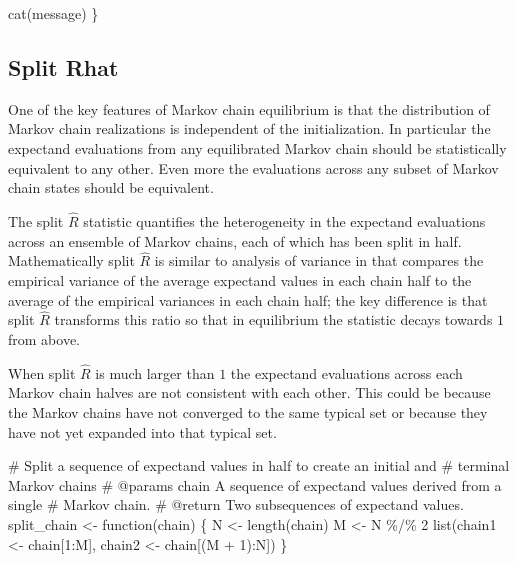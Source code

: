 \documentclass[
  letterpaper,
  DIV=11,
  numbers=noendperiod]{scrartcl}
\newenvironment{Shaded}{\begin{snugshade}}{\end{snugshade}}
\newcommand{\BuiltInTok}[1]{\textcolor[rgb]{0.00,0.23,0.31}{#1}}
\newcommand{\CommentTok}[1]{\textcolor[rgb]{0.37,0.37,0.37}{#1}}
\newcommand{\DecValTok}[1]{\textcolor[rgb]{0.68,0.00,0.00}{#1}}
\newcommand{\NormalTok}[1]{\textcolor[rgb]{0.00,0.23,0.31}{#1}}
\newcommand{\OperatorTok}[1]{\textcolor[rgb]{0.37,0.37,0.37}{#1}}
\begin{document}
\begin{Shaded}
\begin{Highlighting}[]
\NormalTok{  cat(message)}
\NormalTok{\}}
\end{Highlighting}
\end{Shaded}

\subsection{Split Rhat}\label{split-rhat}

One of the key features of Markov chain equilibrium is that the
distribution of Markov chain realizations is independent of the
initialization. In particular the expectand evaluations from any
equilibrated Markov chain should be statistically equivalent to any
other. Even more the evaluations across any subset of Markov chain
states should be equivalent.

The split \(\hat{R}\) statistic quantifies the heterogeneity in the
expectand evaluations across an ensemble of Markov chains, each of which
has been split in half. Mathematically split \(\hat{R}\) is similar to
analysis of variance in that compares the empirical variance of the
average expectand values in each chain half to the average of the
empirical variances in each chain half; the key difference is that split
\(\hat{R}\) transforms this ratio so that in equilibrium the statistic
decays towards \(1\) from above.

When split \(\hat{R}\) is much larger than \(1\) the expectand
evaluations across each Markov chain halves are not consistent with each
other. This could be because the Markov chains have not converged to the
same typical set or because they have not yet expanded into that typical
set.

\begin{Shaded}
\begin{Highlighting}[]
\CommentTok{\# Split a sequence of expectand values in half to create an initial and }
\CommentTok{\# terminal Markov chains}
\CommentTok{\# @params chain A sequence of expectand values derived from a single }
\CommentTok{\#               Markov chain.}
\CommentTok{\# @return Two subsequences of expectand values.}
\NormalTok{split\_chain }\OperatorTok{\textless{}{-}}\NormalTok{ function(chain) \{}
\NormalTok{  N }\OperatorTok{\textless{}{-}}\NormalTok{ length(chain)}
\NormalTok{  M }\OperatorTok{\textless{}{-}}\NormalTok{ N }\OperatorTok{\%/\%} \DecValTok{2}
  \BuiltInTok{list}\NormalTok{(chain1 }\OperatorTok{\textless{}{-}}\NormalTok{ chain[}\DecValTok{1}\NormalTok{:M], chain2 }\OperatorTok{\textless{}{-}}\NormalTok{ chain[(M }\OperatorTok{+} \DecValTok{1}\NormalTok{):N])}
\NormalTok{\}}
\end{Highlighting}
\end{Shaded}
\end{document}
